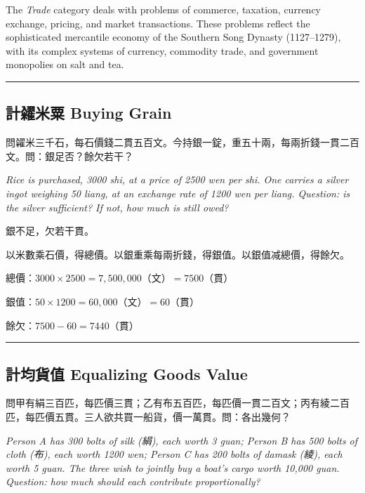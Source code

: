 \documentclass[11pt,a4paper]{article}
\newcommand{\longline}{\noindent\rule{\textwidth}{0.4pt}}
\begin{document}
\medskip

\noindent The \textit{Trade} category deals with problems of commerce, taxation, currency exchange, pricing, and market transactions. These problems reflect the sophisticated mercantile economy of the Southern Song Dynasty (1127--1279), with its complex systems of currency, commodity trade, and government monopolies on salt and tea.

\vspace{0.8em}
\longline

\subsection{計糴米粟 \quad Buying Grain}

\begin{problem}
問糴米三千石，每石價錢二貫五百文。今持銀一錠，重五十兩，每兩折錢一貫二百文。問：銀足否？餘欠若干？

\textit{Rice is purchased, 3000 shi, at a price of 2500 wen per shi. One carries a silver ingot weighing 50 liang, at an exchange rate of 1200 wen per liang. Question: is the silver sufficient? If not, how much is still owed?}
\end{problem}

\begin{answer}
銀不足，欠若干貫。
\end{answer}

\begin{method}
以米數乘石價，得總價。以銀重乘每兩折錢，得銀值。以銀值减總價，得餘欠。
\end{method}

\begin{working}
總價：$3000 \times 2500 = 7{,}500{,}000$（文）$= 7500$（貫）

銀值：$50 \times 1200 = 60{,}000$（文）$= 60$（貫）

餘欠：$7500 - 60 = 7440$（貫）
\end{working}

\vspace{0.5em}
\longline

\subsection{計均貨值 \quad Equalizing Goods Value}

\begin{problem}
問甲有絹三百匹，每匹價三貫；乙有布五百匹，每匹價一貫二百文；丙有綾二百匹，每匹價五貫。三人欲共買一船貨，價一萬貫。問：各出幾何？

\textit{Person A has 300 bolts of silk (絹), each worth 3 guan; Person B has 500 bolts of cloth (布), each worth 1200 wen; Person C has 200 bolts of damask (綾), each worth 5 guan. The three wish to jointly buy a boat's cargo worth 10,000 guan. Question: how much should each contribute proportionally?}
\end{problem}
\end{document}
